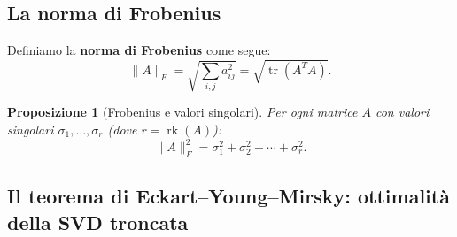 \documentclass[11pt,a4paper]{article}
\theoremstyle{plain}
\newtheorem{proposizione}[teorema]{Proposizione}
\theoremstyle{definition}
\theoremstyle{remark}
\begin{document}

\subsection{La norma di Frobenius}

Definiamo la \textbf{norma di Frobenius} come segue:
\[
  \|A\|_F = \sqrt{\sum_{i,j} a_{ij}^2} = \sqrt{\operatorname{tr}(A^T A)}.
\] \label{eq:frob_metrica}

\begin{proposizione}[Frobenius e valori singolari]
\label{prop:frob}
Per ogni matrice $A$ con valori singolari $\sigma_1, \ldots, \sigma_r$ (dove
$r = \operatorname{rk}(A)$):
\begin{equation}
  \|A\|_F^2 = \sigma_1^2 + \sigma_2^2 + \cdots + \sigma_r^2.
  \label{eq:frob_svd}
\end{equation}
\end{proposizione}



\subsection{Il teorema di Eckart--Young--Mirsky: ottimalità della SVD troncata}
\end{document}
